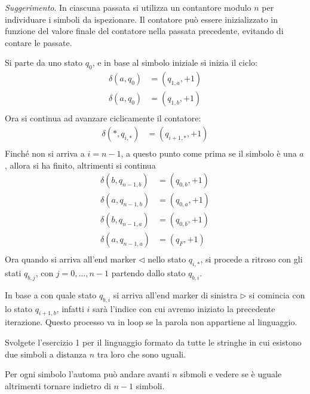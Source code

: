 \documentclass[12pt, answers]{exam}
\begin{document}
\begin{questions}
	\textit{Suggerimento}. In ciascuna passata si utilizza un contantore modulo $n$ per individuare i simboli da ispezionare. Il contatore può essere inizializzato in funzione del valore finale del contatore nella passata precedente, evitando di contare le passate.
	\begin{solution}
		Si parte da uno stato $q_0$, e in base al simbolo iniziale si inizia il ciclo:
		\begin{align*}
			\delta(a, q_0) &= (q_{1, a}, +1) \\
			\delta(a, q_0) &= (q_{1, b}, +1) \\
		\end{align*}
		Ora si continua ad avanzare ciclicamente il contatore:
		\begin{align*}
			\delta(*, q_{i, *}) &= (q_{i + 1, *}, +1) \\
		\end{align*}
		Finché non si arriva a $i = n - 1$, a questo punto come prima se il simbolo è una $a$, allora si ha finito, altrimenti si continua
		\begin{align*}
			\delta(b, q_{n - 1, b}) &= (q_{0, b}, +1) \\
			\delta(a, q_{n - 1, b}) &= (q_{0, a}, +1) \\
			\delta(b, q_{n - 1, a}) &= (q_{0, b}, +1) \\
			\delta(a, q_{n - 1, a}) &= (q_F, +1) \\
		\end{align*}
		Ora quando si arriva all'end marker $\lhd$ nello stato $q_{i, *}$, si procede a ritroso con gli stati $q_{b, j}$, con $j = 0, \dots, n - 1$ partendo dallo stato $q_{b, i}$.

		In base a con quale stato $q_{b, i}$ si arriva all'end marker di sinistra $\rhd$ si comincia con lo stato $q_{i + 1, b}$, infatti $i$ sarà l'indice con cui avremo iniziato la precedente iterazione.
		Questo processo va in loop se la parola non appartiene al linguaggio.
	\end{solution}
	\question Svolgete l'esercizio 1 per il linguaggio formato da tutte le stringhe in cui esistono due simboli a distanza $n$ tra loro che sono uguali.
	\begin{solution}
		Per ogni simbolo l'automa può andare avanti $n$ sibmoli e vedere se è uguale altrimenti tornare indietro di $n - 1$ simboli.


\end{solution}
\end{questions}
\end{document}
